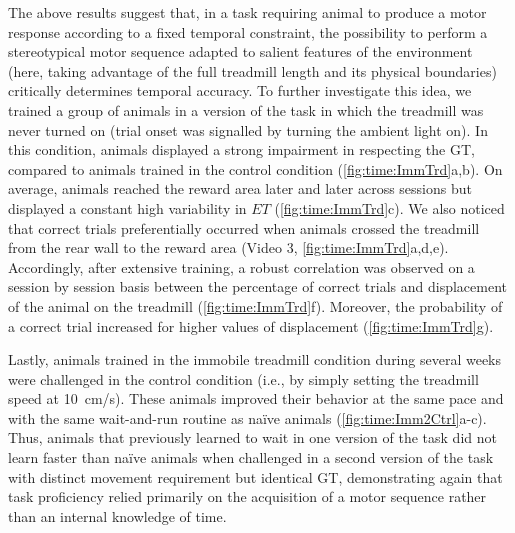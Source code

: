 \par

The above results suggest that, in a task requiring animal to produce a motor response according to a fixed temporal constraint, the possibility to perform a stereotypical motor sequence adapted to salient features of the environment (here, taking advantage of the full treadmill length and its physical boundaries) critically determines temporal accuracy.
To further investigate this idea, we trained a group of animals in a version of the task in which the treadmill was never turned on (trial onset was signalled by turning the ambient light on).
In this condition, animals displayed a strong impairment in respecting the GT, compared to animals trained in the control condition (\autoref{fig:time:ImmTrd}a,b).
On average, animals reached the reward area later and later across sessions but displayed a constant high variability in $ET$ (\autoref{fig:time:ImmTrd}c).
We also noticed that correct trials preferentially occurred when animals crossed the treadmill from the rear wall to the reward area (Video 3, \autoref{fig:time:ImmTrd}a,d,e).
Accordingly, after extensive training, a robust correlation was observed on a session by session basis between the percentage of correct trials and displacement of the animal on the treadmill (\autoref{fig:time:ImmTrd}f).
Moreover, the probability of a correct trial increased for higher values of displacement (\autoref{fig:time:ImmTrd}g).
\par

Lastly, animals trained in the immobile treadmill condition during several weeks were challenged in the control condition (i.e., by simply setting the treadmill speed at 10~cm/s).
These animals improved their behavior at the same pace and with the same wait-and-run routine as na\"ive animals (\autoref{fig:time:Imm2Ctrl}a-c).
Thus, animals that previously learned to wait in one version of the task did not learn faster than na\"ive animals when challenged in a second version of the task with distinct movement requirement but identical GT, demonstrating again that task proficiency relied primarily on the acquisition of a motor sequence rather than an internal knowledge of time.